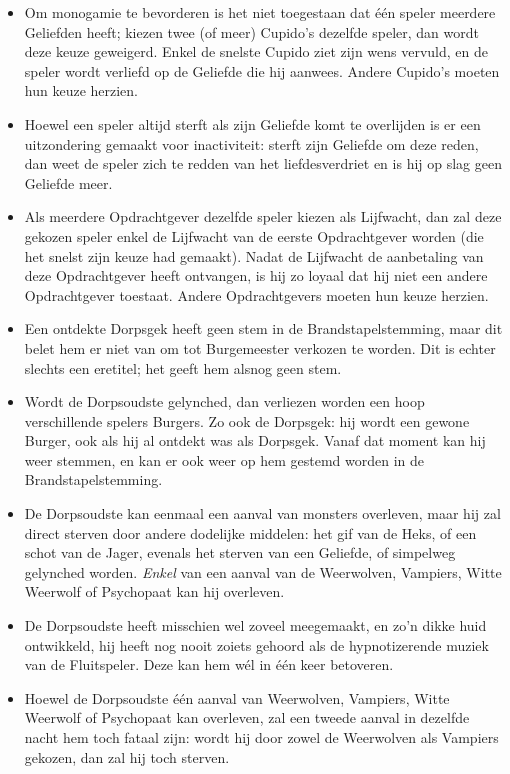 \documentclass[12pt]{article}
\begin{document}
    \begin{itemize}
  	\item Om monogamie te bevorderen is het niet toegestaan dat \'e\'en speler meerdere Geliefden heeft; kiezen twee (of meer) Cupido's dezelfde speler, dan wordt deze keuze geweigerd. Enkel de snelste Cupido ziet zijn wens vervuld, en de speler wordt verliefd op de Geliefde die hij aanwees. Andere Cupido's moeten hun keuze herzien.
  	\item Hoewel een speler altijd sterft als zijn Geliefde komt te overlijden is er een uitzondering gemaakt voor inactiviteit: sterft zijn Geliefde om deze reden, dan weet de speler zich te redden van het liefdesverdriet en is hij op slag geen Geliefde meer.
  	\item Als meerdere Opdrachtgever dezelfde speler kiezen als Lijfwacht, dan zal deze gekozen speler enkel de Lijfwacht van de eerste Opdrachtgever worden (die het snelst zijn keuze had gemaakt). Nadat de Lijfwacht de aanbetaling van deze Opdrachtgever heeft ontvangen, is hij zo loyaal dat hij niet een andere Opdrachtgever toestaat. Andere Opdrachtgevers moeten hun keuze herzien.
  	\item Een ontdekte Dorpsgek heeft geen stem in de Brandstapelstemming, maar dit belet hem er niet van om tot Burgemeester verkozen te worden. Dit is echter slechts een eretitel; het geeft hem alsnog geen stem.
	\item Wordt de Dorpsoudste gelynched, dan verliezen worden een hoop verschillende spelers Burgers. Zo ook de Dorpsgek: hij wordt een gewone Burger, ook als hij al ontdekt was als Dorpsgek. Vanaf dat moment kan hij weer stemmen, en kan er ook weer op hem gestemd worden in de Brandstapelstemming.
  	\item De Dorpsoudste kan eenmaal een aanval van monsters overleven, maar hij zal direct sterven door andere dodelijke middelen: het gif van de Heks, of een schot van de Jager, evenals het sterven van een Geliefde, of simpelweg gelynched worden. \emph{Enkel} van een aanval van de Weerwolven, Vampiers, Witte Weerwolf of Psychopaat kan hij overleven.
  	\item De Dorpsoudste heeft misschien wel zoveel meegemaakt, en zo'n dikke huid ontwikkeld, hij heeft nog nooit zoiets gehoord als de hypnotizerende muziek van de Fluitspeler. Deze kan hem w\'el in \'e\'en keer betoveren.
  	\item Hoewel de Dorpsoudste \'e\'en aanval van Weerwolven, Vampiers, Witte Weerwolf of Psychopaat kan overleven, zal een tweede aanval in dezelfde nacht hem toch fataal zijn: wordt hij door zowel de Weerwolven als Vampiers gekozen, dan zal hij toch sterven.

\end{itemize}
\end{document}
